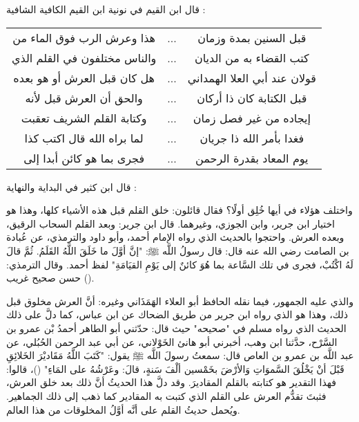 قال ابن القيم في نونية ابن القيم الكافية الشافية \href{https://shamela.ws/book/11375/70#p2}{\faExternalLink}: 

\begin{center}
\begin{tabular}{ccc}
    هذا وعرش الرب فوق الماء من & ... &
    قبل السنين بمدة وزمان  \\
    والناس مختلفون في القلم الذي & ... &
    كتب القضاء به من الديان \\
    هل كان قبل العرش أو هو بعده & ... &
    قولان عند أبي العلا الهمداني \\
    والحق أن العرش قبل لأنه & ... &
    قبل الكتابة كان ذا أركان \\
    وكتابة القلم الشريف تعقبت & ... &
    إيجاده من غير فصل زمان \\
    لما براه الله قال اكتب كذا & ... &
    فغدا بأمر الله ذا جريان \\
    فجرى بما هو كائن أبدا إلى & ... &
    يوم المعاد بقدرة الرحمن \\
\end{tabular}
\end{center}
\bigbreak

قال ابن كثير في البداية والنهاية \href{https://shamela.ws/book/30097/106#p7}{\faExternalLink}:

واختلف هؤلاء في أيها خُلِق أولًا؟ فقال قائلون: خلق القلم قبل هذه الأشياء كلها، وهذا هو اختيار ابن جرير، وابن الجوزي، وغيرهما. قال ابن جرير: وبعد القلم السحاب الرقيق، وبعده العرش. واحتجوا بالحديث الذي رواه الإمام أحمد، وأبو داود والترمذي، عن عُبادة بن الصامت رضي الله عنه قال: قال رسولُ اللَّه ﷺ: "إنَّ أوَّلَ ما خَلَقَ اللَّهُ القَلَمُ. ثُمَّ قالَ لَهُ اكْتُبْ، فجرى في تلك السَّاعة بما هُوَ كائنٌ إلى يَوْمِ القيَامَةِ" لفظ أحمد. وقال الترمذي: حسن صحيح غريب ().

والذي عليه الجمهور، فيما نقله الحافظ أبو العلاء الهَمَذَاني وغيره: أنَّ العرش مخلوق قبل ذلك، وهذا هو الذي رواه ابن جرير من طريق الضحاك عن ابن عباس، كما دلَّ على ذلك الحديث الذي رواه مسلم في "صحيحه" حيث قال: حدّثني أبو الطاهر أحمدُ بْن عمرو بن السَّرْح، حدَّثنا ابن وهب، أخبرني أبو هانئ الخَوْلاني، عن أبي عبد الرحمن الحُبُلي، عن عبد اللَّه بن عمرو بن العاص قال: سمعتُ رسولَ اللَّه ﷺ يقول: "كَتَبَ اللَّهُ مَقَاديْرَ الخَلائِقِ قَبْلَ أنْ يَخْلُقَ السَّموَاتِ وَالأرْضَ بخَمْسين ألْفَ سَنةٍ، قالَ: وعَرْشُهُ على المَاءِ" ()، قالوا: فهذا التقدير هو كتابته بالقلم المقاديرَ. وقد دلَّ هذا الحديثُ أنَّ ذلك بعد خلق العرش، فثبتَ تقدُّم العرش على القلم الذي كتبت به المقادير كما ذهب إلى ذلك الجماهير. ويُحمل حديثُ القلم على أنَّه أوَّلُ المخلوقات من هذا العالم.

